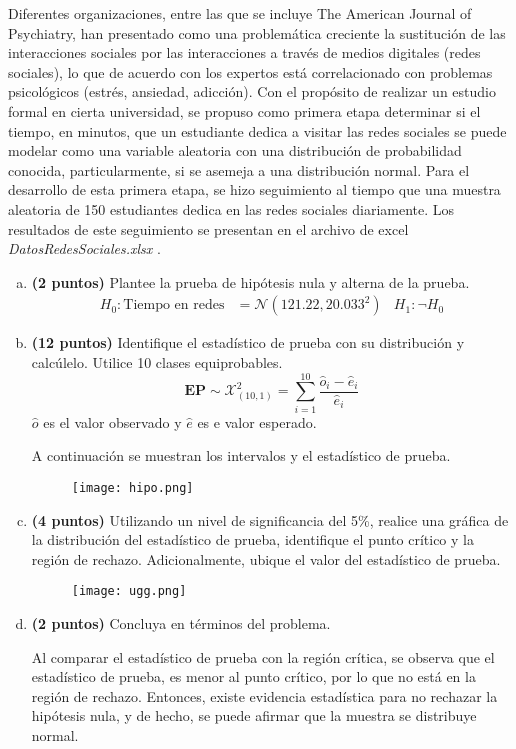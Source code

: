 \documentclass[../main.tex]{subfiles}
\begin{document}
Diferentes organizaciones, entre las que se incluye The American Journal of Psychiatry, han
presentado como una problemática creciente la sustitución de las interacciones sociales por las
interacciones a través de medios digitales (redes sociales), lo que de acuerdo con los expertos está correlacionado con problemas psicológicos (estrés, ansiedad, adicción). Con el propósito de realizar un estudio formal en cierta universidad, se propuso como primera etapa determinar si el tiempo, en minutos, que un estudiante dedica a visitar las redes sociales se puede modelar como una variable aleatoria con una distribución de probabilidad conocida, particularmente, si se asemeja a una distribución normal. Para el desarrollo de esta primera etapa, se hizo seguimiento al tiempo que una muestra aleatoria de 150 estudiantes dedica en las redes sociales diariamente. Los resultados de este seguimiento se presentan en el archivo de excel \textit{DatosRedesSociales.xlsx} .

\begin{enumerate}[(a)]

\item \textbf{(2 puntos)} Plantee la prueba de hipótesis nula y alterna de la prueba.
\begin{align*}
	H_0 : \text{Tiempo en redes} &= \mathcal{N}(121.22, 20.033^2) & H_1 : \neg H_0
\end{align*}

\item \textbf{(12 puntos)} Identifique el estadístico de prueba con su distribución y calcúlelo. Utilice 10 clases equiprobables.
$$\textbf{EP} \sim \mathcal{X}_{(10, 1)}^2 = \sum_{i = 1}^{10} \frac{\hat{o}_i - \hat{e}_i}{\hat{e}_i}$$
$\hat{o}$ es el valor observado y $\hat{e}$ es e valor esperado.

A continuación se muestran los intervalos y el estadístico de prueba.

\begin{figure}[h]
\centering
\texttt{[image: hipo.png]}
\label{fig:img1}
\end{figure}

\pagebreak

\item \textbf{(4 puntos)} Utilizando un nivel de significancia del 5\%, realice una gráfica de la distribución del estadístico de prueba, identifique el punto crítico y la región de rechazo.
Adicionalmente, ubique el valor del estadístico de prueba.

\begin{figure}[h]
\centering
\texttt{[image: ugg.png]}
\label{fig:img1}
\end{figure}

\item \textbf{(2 puntos)} Concluya en términos del problema.

Al comparar el estadístico de prueba con la región crítica, se observa que el estadístico de prueba, es menor al punto crítico, por lo que no está en la región de rechazo. Entonces, existe evidencia estadística para no rechazar la hipótesis nula, y de hecho, se puede afirmar que la muestra se distribuye normal.

\end{enumerate}
\end{document}
